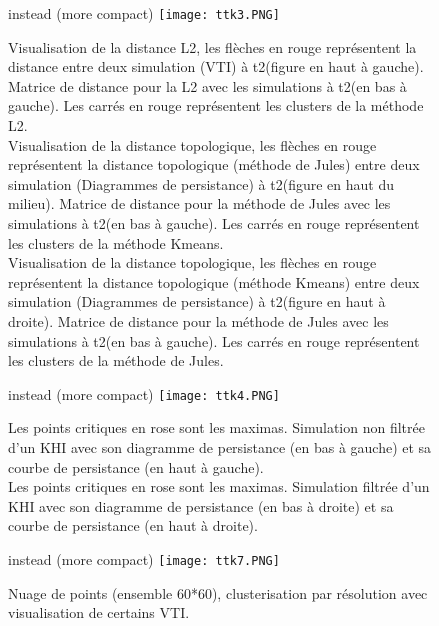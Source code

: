 \begin{figure}[H]
 \centering %
instead (more compact)
 \texttt{[image: ttk3.PNG]}
 \caption{Visualisation de la distance L2, les flèches en rouge représentent la
distance entre deux simulation (VTI) à t2(figure en haut à gauche). Matrice de
distance pour la L2 avec les simulations à t2(en bas à gauche). Les carrés en
rouge représentent les clusters de la méthode L2.\\
 Visualisation de la distance topologique, les flèches en rouge représentent la
distance topologique (méthode de Jules) entre deux simulation (Diagrammes de
persistance) à t2(figure en haut du milieu).
 Matrice de distance pour la méthode de Jules avec les simulations à t2(en bas à
gauche). Les carrés en rouge représentent les clusters de la méthode Kmeans.\\
 Visualisation de la distance topologique, les flèches en rouge représentent la
distance topologique (méthode Kmeans) entre deux simulation (Diagrammes de
persistance) à t2(figure en haut à droite).
  Matrice de distance pour la méthode de Jules avec les simulations à t2(en bas
à gauche). Les carrés en rouge représentent les clusters de la méthode de
Jules.\\}
 \label{fig:sample}
\end{figure}


\begin{figure}[H]
 \centering %
instead (more compact)
 \texttt{[image: ttk4.PNG]}
 \caption{Les points critiques en rose sont les maximas. Simulation non filtrée
d'un KHI avec son diagramme de persistance (en bas à gauche) et sa courbe de
persistance (en haut à gauche).\\
 Les points critiques en rose sont les maximas. Simulation filtrée d'un KHI avec
son diagramme de persistance (en bas à droite) et sa courbe de persistance (en
haut à droite).}
 \label{fig:sample}
\end{figure}


\begin{figure}[H]
 \centering %
instead (more compact)
 \texttt{[image: ttk7.PNG]}
 \caption{Nuage de points (ensemble 60*60), clusterisation par résolution avec
visualisation de certains VTI.}
 \label{fig:sample}
\end{figure}


